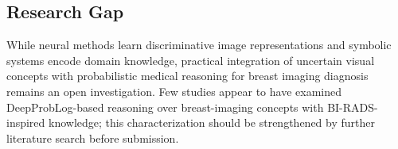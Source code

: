 \subsection{Research Gap}
While neural methods learn discriminative image representations and symbolic systems encode domain knowledge, practical integration of uncertain visual concepts with probabilistic medical reasoning for breast imaging diagnosis remains an open investigation. Few studies appear to have examined DeepProbLog-based reasoning over breast-imaging concepts with BI-RADS-inspired knowledge; this characterization should be strengthened by further literature search before submission.
